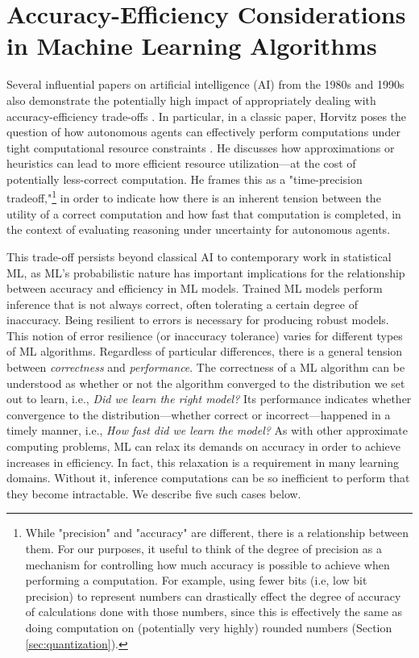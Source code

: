 \documentclass[sigplan,screen]{acmart}
\begin{document}
\section{Accuracy-Efficiency Considerations in Machine Learning Algorithms} \label{sec:ml}
Several influential papers on artificial intelligence (AI) from the 1980s and 1990s also demonstrate the potentially high impact of appropriately dealing with accuracy-efficiency trade-offs \cite{horvitz1987constraints, boddy1994deliberation}. In particular, in a classic paper, Horvitz poses the question of how autonomous agents can effectively perform computations under tight computational resource constraints \cite{horvitz1987constraints}. He discusses how approximations or heuristics can lead to more efficient resource utilization---at the cost of potentially less-correct computation.  He frames this as a "time-precision tradeoff,"\footnote{While "precision" and "accuracy" are different, there is a relationship between them. For our purposes, it useful to think of the degree of precision as a mechanism for controlling how much accuracy is possible to achieve when performing a computation. For example, using fewer bits (i.e, low bit precision) to represent numbers can drastically effect the degree of accuracy of calculations done with those numbers, since this is effectively the same as doing computation on (potentially very highly) rounded numbers (Section \ref{sec:quantization}).} in order to indicate how there is an inherent tension between the utility of a correct computation and how fast that computation is completed, in the context of evaluating reasoning under uncertainty for autonomous agents. 

This trade-off persists beyond classical AI to contemporary work in statistical ML, as ML's probabilistic nature has important implications for the relationship between accuracy and efficiency in ML models. Trained ML models perform inference that is not always correct, often tolerating a certain degree of inaccuracy. Being resilient to errors is necessary for producing robust models. This notion of error resilience (or inaccuracy tolerance) varies for different types of ML algorithms. Regardless of particular differences, there is a general tension between \emph{correctness} and \emph{performance}. The correctness of a ML algorithm can be understood as whether or not the algorithm converged to the distribution we set out to learn, i.e., \emph{Did we learn the right model?} Its performance indicates whether convergence to the distribution---whether correct or incorrect---happened in a timely manner, i.e., \emph{How fast did we learn the model?} As with other approximate computing problems, ML can relax its demands on accuracy in order to achieve increases in efficiency. In fact, this relaxation is a requirement in many learning domains. Without it, inference computations can be so inefficient to perform that they become intractable. We describe five such cases below.
\end{document}
